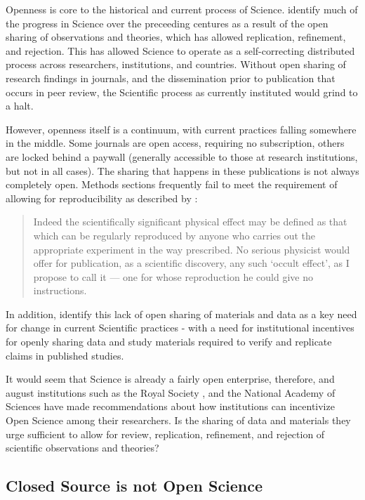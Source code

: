 \documentclass[12pt,a4paper,titlepage]{scrreprt}
\begin{document}
Openness is core to the historical and current process of Science. \textcite{boulton_science_2012} identify much of the progress in Science over the preceeding centures as a result of the open sharing of observations and theories, which has allowed replication, refinement, and rejection. This has allowed Science to operate as a self-correcting distributed process across researchers, institutions, and countries. Without open sharing of research findings in journals, and the dissemination prior to publication that occurs in peer review, the Scientific process as currently instituted would grind to a halt.

However, openness itself is a continuum, with current practices falling somewhere in the middle. Some journals are open access, requiring no subscription, others are locked behind a paywall (generally accessible to those at research institutions, but not in all cases). The sharing that happens in these publications is not always completely open. Methods sections frequently fail to meet the requirement of allowing for reproducibility as described by \textcite[pp.~24-25]{popper_logic_1959}: \begin{quote} Indeed the scientifically significant physical effect may be defined as that which can be regularly reproduced by anyone who carries out the appropriate experiment in the way prescribed. No serious physicist would offer for publication, as a scientific discovery, any such ‘occult effect’, as I propose to call it — one for whose reproduction he could give no instructions.\end{quote} In addition, \citeauthor{boulton_science_2012} identify this lack of open sharing of materials and data as a key need for change in current Scientific practices - with a need for institutional incentives for openly sharing data and study materials required to verify and replicate claims in published studies.

It would seem that Science is already a fairly open enterprise, therefore, and august institutions such as the Royal Society \parencite{boulton_science_2012}, and the National Academy of Sciences \parencite{committee_on_science_engineering_ensuring_2009} have made recommendations about how institutions can incentivize Open Science among their researchers. Is the sharing of data and materials they urge sufficient to allow for review, replication, refinement, and rejection of scientific observations and theories?

\subsection{Closed Source is not Open Science}
\end{document}
